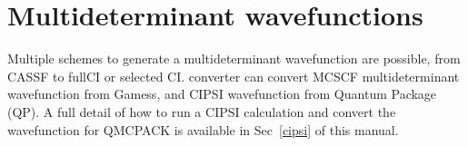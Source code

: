 \section{Multideterminant wavefunctions}
\label{sec:multideterminants}
Multiple schemes to generate a multideterminant wavefunction are possible, from CASSF to fullCI or selected CI. \qmcpack converter can convert MCSCF multideterminant wavefunction from Gamess\cite{schmidt93}, and CIPSI\cite{caffarel2013} wavefunction from Quantum Package\cite{QP} (QP). A full detail of how to run a CIPSI calculation and convert the wavefunction for QMCPACK is available in Sec~\ref{cipsi}  of this manual.